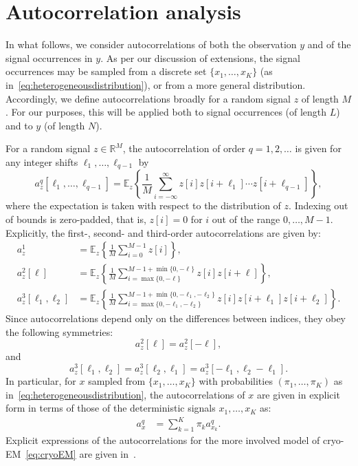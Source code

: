 \documentclass[12pt]{article}
\newcommand{\E}{\mathbb{E}}
\newcommand{\1}{\mathbf{1}}
\newcommand{\R}{\mathbb{R}}
\theoremstyle{plain}
\theoremstyle{definition}
\theoremstyle{remark}
\theoremstyle{plain}
\theoremstyle{remark}
\theoremstyle{plain}
\theoremstyle{plain}
\theoremstyle{plain}
\numberwithin{equation}{section}
\begin{document}
\section{Autocorrelation analysis} \label{sec:AC_analysis}

In what follows, we consider autocorrelations of both the observation $y$ and of the signal occurrences in $y$. As per our discussion of extensions, the signal occurrences may be sampled from a discrete set $\{x_1, \ldots, x_K\}$ (as in~\eqref{eq:heterogeneousdistribution}), or from a more general distribution. Accordingly, we define autocorrelations broadly for a random signal $z$ of length $M$. For our purposes, this will be applied both to signal occurrences (of length $L$) and to $y$ (of length $N$).

For a random signal $z\in \R^M$, the autocorrelation of order $q = 1, 2, \ldots$ is given for any integer shifts $\ell_1, \ldots, \ell_{q-1}$ by
\begin{equation}
a_z^q[\ell_1,\ldots,\ell_{q-1}]   = \E_z\left\{\frac{1}{M} \sum_{i=-\infty}^{\infty} z[i]z[i+\ell_1]\cdots z[i+\ell_{q-1}]\right\},
\label{eq:ac_general}
\end{equation}
where the expectation is taken with respect to the distribution of $z$. Indexing out of bounds is zero-padded, that is, $z[i] = 0$ for $i$ out of the range $0, \ldots, M-1$.
Explicitly, the first-, second- and third-order autocorrelations are given by: 
\begin{align}  
a_z^1 & = \E_z\left\{\frac{1}{M} \sum_{i=0}^{M-1} 
z[i]\right\}, \nonumber\\
a_z^2[\ell] & = \E_z\left\{\frac{1}{M} \sum_{i = \max\{0, -\ell\}}^{M-1 + \min\{0, -\ell\}} z[i]z[i+\ell]\right\}, \label{eq:ac_special} \\
a_z^3[\ell_1,\ell_2] & = \E_z\left\{\frac{1}{M} \sum_{i = \max\{0, -\ell_1, -\ell_2\}}^{M-1 + \min\{0, -\ell_1, -\ell_2\}} z[i]z[i+\ell_1]z[i+\ell_2]\right\}. \nonumber
\end{align}
Since  autocorrelations depend only on the differences between indices, they obey the following symmetries: $$a_z^2[\ell] = a_z^2[-\ell],$$ and
$$a_z^3[\ell_1,\ell_2] = a_z^3[\ell_2,\ell_1]=a_z^3[-\ell_1,\ell_2-\ell_1].
$$
In particular, for
$x$ sampled from $\{ x_1, \ldots, x_K \}$ with probabilities $(\pi_1, \ldots, \pi_K)$ as in~\eqref{eq:heterogeneousdistribution}, the autocorrelations of $x$ are given in explicit form in terms of those of the deterministic signals $x_1, \ldots, x_K$ as:
\begin{align}
	a_x^q  & = \sum_{k=1}^{K} \pi_ka_{x_k}^q.
	\label{eq:mixedautocorr}
\end{align}
Explicit expressions of the autocorrelations for the more involved model of  cryo-EM~\eqref{eq:cryoEM} are given in~\cite{bendory2018toward}.
\end{document}
